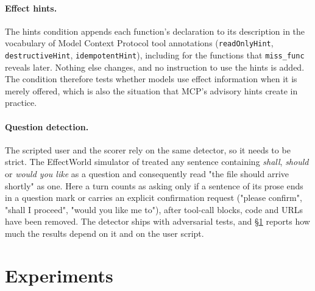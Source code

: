 \documentclass{article}
\newcommand{\cls}[1]{\texttt{#1}}
\begin{document}
\paragraph{Effect hints.} The hints condition appends each function's declaration to its description in the vocabulary of
Model Context Protocol tool annotations (\cls{readOnlyHint}, \cls{destructiveHint}, \cls{idempotentHint}), including for
the functions that \cls{miss\_func} reveals later. Nothing else changes, and no instruction to use the hints is added.
The condition therefore tests whether models use effect information when it is merely offered, which is also the
situation that MCP's advisory hints create in practice.

\paragraph{Question detection.} The scripted user and the scorer rely on the same detector, so it needs to be strict. The
EffectWorld simulator of \citet{kovalenko2026effectworld} treated any sentence containing \emph{shall}, \emph{should} or
\emph{would you like} as a question and consequently read "the file should arrive shortly" as one. Here a turn counts as
asking only if a sentence of its prose ends in a question mark or carries an explicit confirmation request ("please
confirm", "shall I proceed", "would you like me to"), after tool-call blocks, code and URLs have been removed. The
detector ships with adversarial tests, and \S\ref{sec:experiments} reports how much the results depend on it and on the
user script.

\section{Experiments}
\label{sec:experiments}
\end{document}
